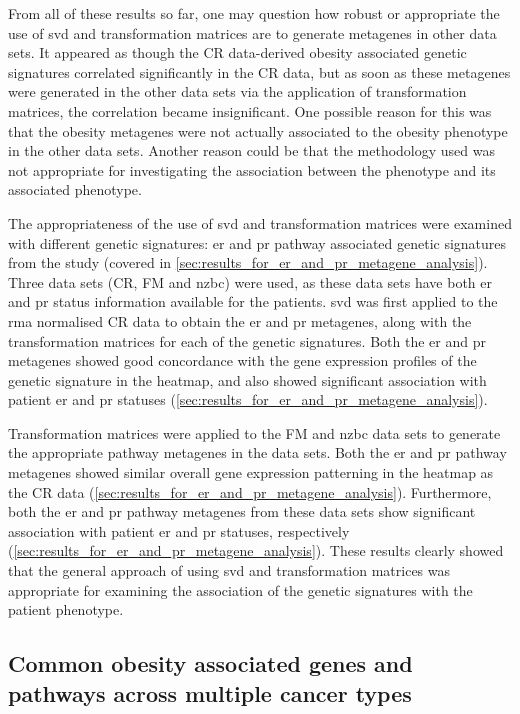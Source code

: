 From all of these results so far, one may question how robust or appropriate the use of \gls{svd} and transformation matrices are to generate metagenes in other data sets.
It appeared as though the CR data-derived obesity associated genetic signatures correlated significantly in the CR data, but as soon as these metagenes were generated in the other data sets via the application of transformation matrices, the correlation became insignificant.
One possible reason for this was that the obesity metagenes were not actually associated to the obesity phenotype in the other data sets.
Another reason could be that the methodology used was not appropriate for investigating the association between the phenotype and its associated phenotype.

The appropriateness of the use of \gls{svd} and transformation matrices were examined with different genetic signatures: \gls{er} and \gls{pr} pathway associated genetic signatures from the \citet{Gatza2010a} study (covered in \cref{sec:results_for_er_and_pr_metagene_analysis}).
Three data sets (CR, FM and \gls{nzbc}) were used, as these data sets have both \gls{er} and \gls{pr} status information available for the patients.
\gls{svd} was first applied to the \gls{rma} normalised CR data to obtain the \gls{er} and \gls{pr} metagenes, along with the transformation matrices for each of the genetic signatures.
Both the \gls{er} and \gls{pr} metagenes showed good concordance with the gene expression profiles of the genetic signature in the heatmap, and also showed significant association with patient \gls{er} and \gls{pr} statuses (\cref{sec:results_for_er_and_pr_metagene_analysis}).

Transformation matrices were applied to the FM and \gls{nzbc} data sets to generate the appropriate pathway metagenes in the data sets.
Both the \gls{er} and \gls{pr} pathway metagenes showed similar overall gene expression patterning in the heatmap as the CR data (\cref{sec:results_for_er_and_pr_metagene_analysis}).
Furthermore, both the \gls{er} and \gls{pr} pathway metagenes from these data sets show significant association with patient \gls{er} and \gls{pr} statuses, respectively (\cref{sec:results_for_er_and_pr_metagene_analysis}).
These results clearly showed that the general approach of using \gls{svd} and transformation matrices was appropriate for examining the association of the genetic signatures with the patient phenotype.

\subsection{Common obesity associated genes and pathways across multiple cancer types}
\label{sub:common_obesity_associated_genes_and_pathways_across_multiple_cancer_types}

